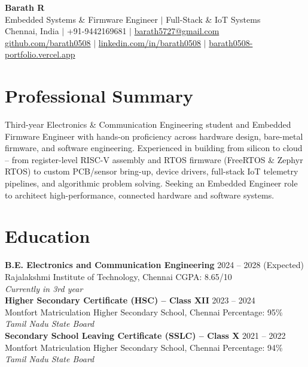 \documentclass[a4paper,10pt]{article}
\begin{document}
\begin{center}
    {\LARGE \textbf{Barath R}} \\[2pt]
    Embedded Systems \& Firmware Engineer $\vert$ Full-Stack \& IoT Systems \\[2pt]
    Chennai, India $\vert$ +91-9442169681 $\vert$ \href{mailto:barath5727@gmail.com}{barath5727@gmail.com} \\
    \href{https://github.com/barath0508}{github.com/barath0508} $\vert$ \href{https://www.linkedin.com/in/barath0508/}{linkedin.com/in/barath0508} $\vert$ \href{https://barath0508-portfolio.vercel.app}{barath0508-portfolio.vercel.app}
\end{center}

\section*{Professional Summary}
Third-year Electronics \& Communication Engineering student and Embedded Firmware Engineer with hands-on proficiency across hardware design, bare-metal firmware, and software engineering. Experienced in building from silicon to cloud -- from register-level RISC-V assembly and RTOS firmware (FreeRTOS \& Zephyr RTOS) to custom PCB/sensor bring-up, device drivers, full-stack IoT telemetry pipelines, and algorithmic problem solving. Seeking an Embedded Engineer role to architect high-performance, connected hardware and software systems.

\section*{Education}
\textbf{B.E. Electronics and Communication Engineering} \hfill 2024 -- 2028 (Expected) \\
Rajalakshmi Institute of Technology, Chennai \hfill CGPA: 8.65/10 \\
\textit{Currently in 3rd year} \\[2pt]
\textbf{Higher Secondary Certificate (HSC) -- Class XII} \hfill 2023 -- 2024 \\
Montfort Matriculation Higher Secondary School, Chennai \hfill Percentage: 95\% \\
\textit{Tamil Nadu State Board} \\[2pt]
\textbf{Secondary School Leaving Certificate (SSLC) -- Class X} \hfill 2021 -- 2022 \\
Montfort Matriculation Higher Secondary School, Chennai \hfill Percentage: 94\% \\
\textit{Tamil Nadu State Board}
\end{document}
